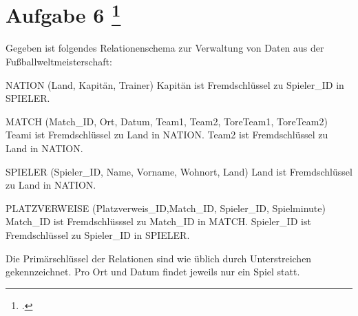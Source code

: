 \documentclass{lehramt-informatik-aufgabe}
\begin{document}
\section{Aufgabe 6
\footcite{66116:2021:03}}

Gegeben ist folgendes Relationenschema zur Verwaltung von Daten aus der
Fußballweltmeisterschaft:

NATION (Land, Kapitän, Trainer)
Kapitän ist Fremdschlüssel zu Spieler\_ID in SPIELER.

MATCH (Match\_ID, Ort, Datum, Team1, Team2, ToreTeam1, ToreTeam2)
Teami ist Fremdschlüssel zu Land in NATION.
Team2 ist Fremdschlüssel zu Land in NATION.

SPIELER (Spieler\_ID, Name, Vorname, Wohnort, Land)
Land ist Fremdschlüssel zu Land in NATION.

PLATZVERWEISE (Platzverweis\_ID,Match\_ID, Spieler\_ID, Spielminute)
Match\_ID ist Fremdschlüsssel zu Match\_ID in MATCH.
Spieler\_ID ist Fremdschlüssel zu Spieler\_ID in SPIELER.

Die Primärschlüssel der Relationen sind wie üblich durch Unterstreichen
gekennzeichnet. Pro Ort und Datum findet jeweils nur ein Spiel statt.
\end{document}

